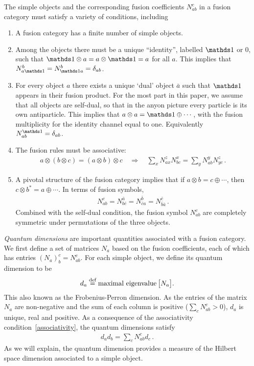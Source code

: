 The simple objects and the corresponding fusion coefficients $N_{ab}^c$ in a fusion category must satisfy a variety of conditions, including \cite{etingof2015,etingof2005}
\begin{enumerate}
\item	 A fusion category has a finite number of simple objects. 
\item
Among the objects there must be a unique ``identity'', labelled $\I$ or $0$, such that $\I \otimes a = a \otimes \I = a$ for all $a$. 
This implies that $N_{a \I}^b = N_{\I a}^b = \delta_{ab}$. 
\item
For every object $a$ there exists a unique `dual' object $\bar{a}$ such that $\I$ appears in their fusion product.
For the most part in this paper, we assume that all objects are self-dual, so that in the anyon picture every particle is its own antiparticle.
This implies that $a \otimes a = \I \oplus \cdots$, with the fusion multiplicity for the identity channel equal to one.
Equivalently $N^\I_{ab} = \delta_{ab}$.
\item
The fusion rules must be associative:
\begin{align}
	a \otimes(b \otimes c) = (a\otimes b) \otimes c \quad
	\Rightarrow \quad \sum_{x} N_{ax}^z N_{bc}^x = \sum_{y} N_{ab}^y N_{yc}^z \,.
\label{associativity}
\end{align}
\item	A pivotal structure of the fusion category implies that if $a \otimes b = c \oplus \cdots$, then $c \otimes b^\ast = a \oplus \cdots$.
In terms of fusion symbols,
\begin{align}
	N_{ab}^c = N_{b \bar{c}}^{\bar{a}} = N_{\bar{c} a} ^{\bar{b}} = N_{\bar{b} \bar{a}} ^{\bar{c}} \,.
	\label{eq:pivotal_N}
\end{align}
Combined with the self-dual condition, the fusion symbol $N_{ab}^c$ are completely symmetric under permutations of the three objects.
\end{enumerate}

{\em Quantum dimensions} are important quantities associated with a fusion category.  
We first define a set of matrices $N_a$ based on the fusion coefficients, each of which has entries $(N_a)^c_b=N^c_{ab}$.
For each simple object, we define its quantum dimension to be
\begin{align}
	d_a \mathrel{\overset{\textrm{def}}{=}} \operatorname{maximal\ eigenvalue}\big[ N_a \big] .
	\label{eq:QD_def}
\end{align}
This also known as the Frobenius-Perron dimension.
As the entries of the matrix $N_a$ are non-negative and the sum of each column is positive ($\sum_c N_{ab}^c > 0$), $d_a$ is unique, real and positive.
As a consequence of the associativity condition~\eqref{associativity}, the quantum dimensions satisfy
\begin{align}
	d_a d_b = \sum_c N_{ab}^c d_c \,.
	\label{eq:ddNd}
\end{align}
As we will explain, the quantum dimension provides a measure of the Hilbert space dimension associated to a simple object.



